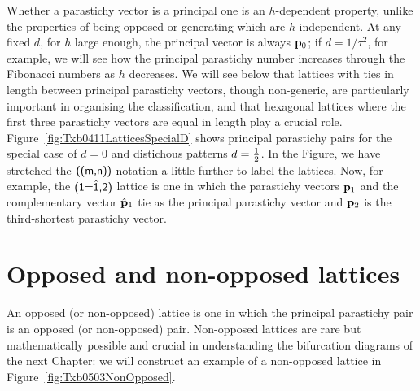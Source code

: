 Whether a parastichy vector is a principal one is an $h$-dependent property, unlike the properties of being opposed or generating which are $h$-independent. At any fixed $d$, for $h$ large enough, the principal vector is always ${\mathbf p}_{0}$; if $d=1/\tau^2$, for example, we will see  how the principal parastichy number increases through the Fibonacci numbers as $h$ decreases. We will see below that lattices with ties in length between principal parastichy vectors, though non-generic, are particularly important in organising the classification, and that hexagonal lattices where the first three parastichy vectors are equal in length play a crucial role. 
Figure~\ref{fig:Txb0411LatticesSpecialD} shows principal parastichy pairs for the special case of  $d=0$ and distichous patterns $d=\textstyle{\frac{1}{2}}$.  
In the Figure,  we have stretched the $\textsf{((m,n))}$ notation a little further to label the lattices. Now, for example, the $\textsf{(1=\ensuremath{\hat{\textsf{1}}},2)}$ lattice is one in which the parastichy vectors ${\mathbf p}_{1}$ and the complementary vector $\hat{\mathbf p}_{1}$ tie as the principal parastichy vector and ${\mathbf p}_{2}$ is the third-shortest parastichy vector.

\section{Opposed and non-opposed lattices}
An opposed (or non-opposed) lattice is one in which the principal parastichy pair is an opposed (or non-opposed) pair. Non-opposed lattices are rare but mathematically possible and crucial in understanding the bifurcation diagrams of the next Chapter: we will construct an example of a non-opposed lattice in  Figure~\ref{fig:Txb0503NonOpposed}.

